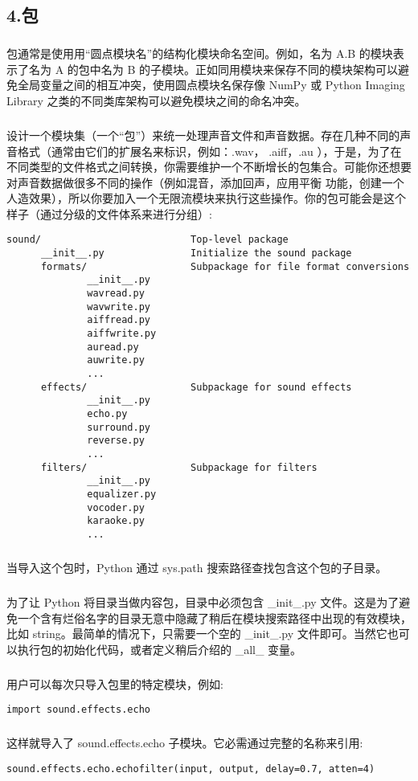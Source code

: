\documentclass{article}
\begin{document}
\begin{CJK}{UTF8}{gbsn}
\section*{4.包}
\subparagraph*{}
包通常是使用用“圆点模块名”的结构化模块命名空间。例如，名为 A.B 的模块表示了名为 A 的包中名为 B 的子模块。正如同用模块来保存不同的模块架构可以避免全局变量之间的相互冲突，使用圆点模块名保存像 NumPy 或 Python Imaging Library 之类的不同类库架构可以避免模块之间的命名冲突。
\subparagraph*{}
设计一个模块集（一个“包”）来统一处理声音文件和声音数据。存在几种不同的声音格式（通常由它们的扩展名来标识，例如：.wav， .aiff，.au ），于是，为了在不同类型的文件格式之间转换，你需要维护一个不断增长的包集合。可能你还想要对声音数据做很多不同的操作（例如混音，添加回声，应用平衡 功能，创建一个人造效果），所以你要加入一个无限流模块来执行这些操作。你的包可能会是这个样子（通过分级的文件体系来进行分组）:
\begin{verbatim}
sound/                          Top-level package
      __init__.py               Initialize the sound package
      formats/                  Subpackage for file format conversions
              __init__.py
              wavread.py
              wavwrite.py
              aiffread.py
              aiffwrite.py
              auread.py
              auwrite.py
              ...
      effects/                  Subpackage for sound effects
              __init__.py
              echo.py
              surround.py
              reverse.py
              ...
      filters/                  Subpackage for filters
              __init__.py
              equalizer.py
              vocoder.py
              karaoke.py
              ...
\end{verbatim}
\subparagraph*{}
当导入这个包时，Python 通过 sys.path 搜索路径查找包含这个包的子目录。
\subparagraph*{}
为了让 Python 将目录当做内容包，目录中必须包含 \_{}init\_{}.py 文件。这是为了避免一个含有烂俗名字的目录无意中隐藏了稍后在模块搜索路径中出现的有效模块，比如 string。最简单的情况下，只需要一个空的 \_{}init\_{}.py 文件即可。当然它也可以执行包的初始化代码，或者定义稍后介绍的 \_{}all\_{} 变量。
\subparagraph*{}
用户可以每次只导入包里的特定模块，例如:
\begin{verbatim}
import sound.effects.echo
\end{verbatim}
\subparagraph*{}
这样就导入了 sound.effects.echo 子模块。它必需通过完整的名称来引用:
\begin{verbatim}
sound.effects.echo.echofilter(input, output, delay=0.7, atten=4)
\end{verbatim}
\subparagraph*{}

\end{CJK}
\end{document}
